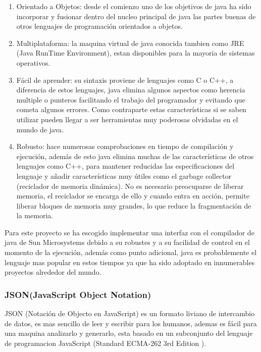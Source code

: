 \begin{enumerate}
	
	\item Orientado a Objetos: desde el comienzo uno de los objetivos de java ha sido incorporar y fusionar dentro del nucleo principal de java las partes buenas de otros lenguajes de programación orientados a objetos.
	
	\item Multiplataforma: la maquina virtual de java conocida tambien como JRE (Java RunTime Environment), estan disponibles para la mayoria de sistemas operativos.
	
	\item Fácil de aprender: su sintaxis proviene de lenguajes como C o C++, a diferencia de estos lenguajes, java elimina algunos aspectos como herencia multiple o punteros facilitando el trabajo del programador y evitando que cometa algunos errores. Como contraparte estas características si se saben utilizar pueden llegar a ser herramientas muy poderosas olvidadas en el mundo de java.
	
	\item Robusto: hace numerosas comprobaciones en tiempo de compilación y ejecución, además de esto java elimina muchas de las características de otros lenguajes como C++, para mantener reducidas las especificaciones del lenguaje y añadir características muy útiles como el garbage collector (reciclador de memoria dinámica). No es necesario preocuparse de liberar memoria, el reciclador se encarga de ello y cuando entra en acción, permite liberar bloques de memoria muy grandes, lo que reduce la fragmentación de la memoria.
	
\end{enumerate}

Para este proyecto se ha escogido implementar una interfaz con el compilador de java de Sun Microsystems debido a su robustes y a su facilidad de control en el momento de la ejecución, además como punto adicional, java es probablemente el lenguaje mas popular en estos tiempos ya que ha sido adoptado en innumerables proyectos alrededor del mundo.


\subsubsection*{JSON(JavaScript Object Notation) \cite{json} }
\label{tec:json}

JSON (Notación de Objecto en JavaScript) es un formato liviano de intercambio de datos, es mas sencillo de leer y escribir para los humanos, ademas es fácil para una maquina analizarlo y generarlo, esta basado en un subconjunto del lenguaje de programacion JavaScript (Standard ECMA-262 3rd Edition \cite{json_ecma}).

